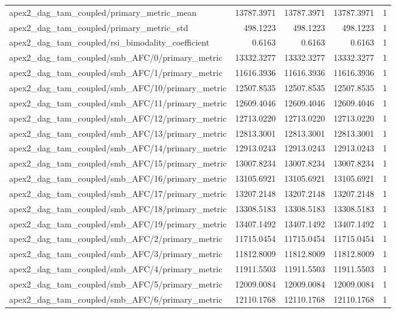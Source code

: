 \begin{table}[h]
\begin{tabular}{lrrrr}
apex2_dag_tam_coupled/primary_metric_mean & 13787.3971 & 13787.3971 & 13787.3971 & 1 \\
apex2_dag_tam_coupled/primary_metric_std & 498.1223 & 498.1223 & 498.1223 & 1 \\
apex2_dag_tam_coupled/rsi_bimodality_coefficient & 0.6163 & 0.6163 & 0.6163 & 1 \\
apex2_dag_tam_coupled/smb_AFC/0/primary_metric & 13332.3277 & 13332.3277 & 13332.3277 & 1 \\
apex2_dag_tam_coupled/smb_AFC/1/primary_metric & 11616.3936 & 11616.3936 & 11616.3936 & 1 \\
apex2_dag_tam_coupled/smb_AFC/10/primary_metric & 12507.8535 & 12507.8535 & 12507.8535 & 1 \\
apex2_dag_tam_coupled/smb_AFC/11/primary_metric & 12609.4046 & 12609.4046 & 12609.4046 & 1 \\
apex2_dag_tam_coupled/smb_AFC/12/primary_metric & 12713.0220 & 12713.0220 & 12713.0220 & 1 \\
apex2_dag_tam_coupled/smb_AFC/13/primary_metric & 12813.3001 & 12813.3001 & 12813.3001 & 1 \\
apex2_dag_tam_coupled/smb_AFC/14/primary_metric & 12913.0243 & 12913.0243 & 12913.0243 & 1 \\
apex2_dag_tam_coupled/smb_AFC/15/primary_metric & 13007.8234 & 13007.8234 & 13007.8234 & 1 \\
apex2_dag_tam_coupled/smb_AFC/16/primary_metric & 13105.6921 & 13105.6921 & 13105.6921 & 1 \\
apex2_dag_tam_coupled/smb_AFC/17/primary_metric & 13207.2148 & 13207.2148 & 13207.2148 & 1 \\
apex2_dag_tam_coupled/smb_AFC/18/primary_metric & 13308.5183 & 13308.5183 & 13308.5183 & 1 \\
apex2_dag_tam_coupled/smb_AFC/19/primary_metric & 13407.1492 & 13407.1492 & 13407.1492 & 1 \\
apex2_dag_tam_coupled/smb_AFC/2/primary_metric & 11715.0454 & 11715.0454 & 11715.0454 & 1 \\
apex2_dag_tam_coupled/smb_AFC/3/primary_metric & 11812.8009 & 11812.8009 & 11812.8009 & 1 \\
apex2_dag_tam_coupled/smb_AFC/4/primary_metric & 11911.5503 & 11911.5503 & 11911.5503 & 1 \\
apex2_dag_tam_coupled/smb_AFC/5/primary_metric & 12009.0084 & 12009.0084 & 12009.0084 & 1 \\
apex2_dag_tam_coupled/smb_AFC/6/primary_metric & 12110.1768 & 12110.1768 & 12110.1768 & 1 \\

\end{tabular}
\end{table}
